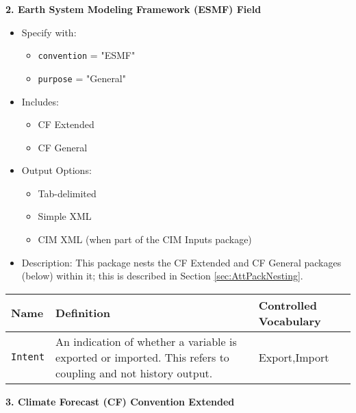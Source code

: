 \vspace{.20in}

{\bf 2. Earth System Modeling Framework (ESMF) Field}

\begin{itemize}
    \item Specify with:
    \begin{itemize}
        \item {\tt convention} = "ESMF"
        \item {\tt purpose} = "General"
    \end{itemize}
    \item Includes: 
    \begin{itemize}
        \item CF Extended
        \item CF General
    \end{itemize}
    \item Output Options: 
    \begin{itemize}
        \item Tab-delimited
        \item Simple XML
        \item CIM XML (when part of the CIM Inputs package)
    \end{itemize}
    \item Description: This package nests the CF Extended and CF General packages (below) within it; this is described in Section \ref{sec:AttPackNesting}.
\end{itemize}

\begin{tabular}{|p{5cm}|p{5cm}|p{35mm}|}
     \hline\hline
     {\bf Name } & {\bf Definition} & {\bf Controlled Vocabulary} \\
     \hline\hline
     {\tt Intent} & An indication of whether a variable is exported or imported. This refers to coupling and not history output. & Export,Import\\
     \hline\hline
\end{tabular}

\vspace{.20in}

{\bf 3. Climate Forecast (CF) Convention Extended}

